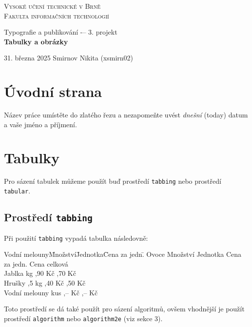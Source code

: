 \documentclass[a4paper,11pt]{article}
\begin{document}
\thispagestyle{empty}
\begin{center}
    \Huge \textsc{Vysoké učení technické v Brně}\\
    \huge\textsc{Fakulta informačních technologií}\\
    
    
    Typografie a publikování -– 3. projekt\\
    \textbf{Tabulky a obrázky}\\
    
\end{center}

{\LARGE 31. března 2025 \hfill Smirnov Nikita (xsmirn02)}
\clearpage

\setcounter{page}{1}

\section{Úvodní strana}
Název práce umístěte do zlatého řezu a nezapomeňte uvést \textit{dnešní} (today) datum a vaše jméno a příjmení.

\section{Tabulky}
 Pro sázení tabulek můžeme použít buď prostředí \texttt{tabbing} nebo prostředí \texttt{tabular}.

\subsection{Prostředí \texttt{tabbing}}
Při použití \texttt{tabbing} vypadá tabulka následovně:

\begin{tabbing}
    Vodní melouny\quad \=  Množství\quad \= Jednotka\quad \= Cena za jedn.\quad \= \kill
    Ovoce \> Množství \> Jednotka \> Cena za jedn. \> Cena celková \\
    Jablka  \> kg ,90 Kč ,70 Kč \\
    Hrušky ,5 \> kg ,40 Kč ,50 Kč \\
    Vodní melouny  \> kus ,– Kč ,– Kč \\
\end{tabbing}
Toto prostředí se dá také použít pro sázení algoritmů, ovšem vhodnější je použít prostředí \texttt{algorithm} nebo \texttt{algorithm2e} (viz sekce 3).
\end{document}
